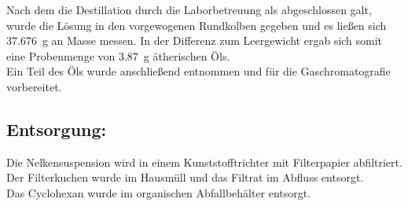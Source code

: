 Nach dem die Destillation durch die Laborbetreuung als abgeschlossen galt, wurde die Lösung in den vorgewogenen Rundkolben gegeben und es ließen sich \SI{37,676}{\gram} an Masse messen.
In der Differenz zum Leergewicht ergab sich somit eine Probenmenge von \SI{3,87}{\gram} ätherischen Öls.\\
Ein Teil des Öls wurde anschließend entnommen und für die Gaschromatografie vorbereitet.

\subsection*{Entsorgung:}
Die Nelkensuspension wird in einem Kunststofftrichter mit Filterpapier abfiltriert. Der Filterkuchen wurde im Hausmüll und das Filtrat im Abfluss entsorgt.\\
Das Cyclohexan wurde im organischen Abfallbehälter entsorgt.